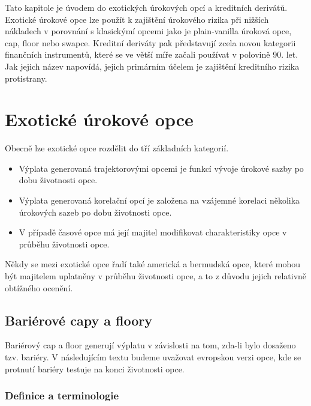 \documentclass[a4paper]{book}
\begin{document}
Tato kapitole je úvodem do exotických úrokových opcí a kreditních derivátů. Exotické úrokové opce lze použít k zajištění úrokového rizika při nižších nákladech v porovnání s klasickýmí opcemi jako je plain-vanilla úroková opce, cap, floor nebo swapce. Kreditní deriváty pak představují zcela novou kategorii finančních instrumentů, které se ve větší míře začali používat v polovině 90. let. Jak jejich název napovídá, jejich primárním účelem je zajištění kreditního rizika protistrany.

\section{Exotické úrokové opce}

Obecně lze exotické opce rozdělit do tří základních kategorií.
\begin{itemize}
\item Výplata generovaná trajektorovými opcemi je funkcí vývoje úrokové sazby po dobu životnosti opce.
\item Výplata generovaná korelační opcí je založena na vzájemné korelaci několika úrokových sazeb po dobu životnosti opce.
\item V případě časové opce má její majitel modifikovat charakteristiky opce v průběhu životnosti opce. 
\end{itemize}
Někdy se mezi exotické opce řadí také americká a bermudská opce, které mohou být majitelem uplatněny v průběhu životnosti opce, a to z důvodu jejich relativně obtížného ocenění.

\subsection{Bariérové capy a floory}

Bariérový cap a floor generují výplatu v závislosti na tom, zda-li bylo dosaženo tzv. bariéry. V následujícím textu budeme uvažovat evropskou verzi opce, kde se protnutí bariéry testuje na konci životnosti opce.

\subsubsection{Definice a terminologie}
\end{document}
